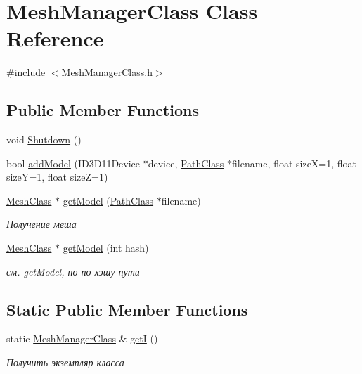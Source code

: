 \hypertarget{class_mesh_manager_class}{}\section{Mesh\+Manager\+Class Class Reference}
\label{class_mesh_manager_class}


{\ttfamily \#include $<$Mesh\+Manager\+Class.\+h$>$}

\subsection*{Public Member Functions}
\begin{DoxyCompactItemize}
\item 
void \hyperlink{class_mesh_manager_class_a65269ec3ad4c2295fd5a45c78aebdefb}{Shutdown} ()
\item 
bool \hyperlink{class_mesh_manager_class_a8f994d06e573766948bf7731ada8567a}{add\+Model} (I\+D3\+D11\+Device $\ast$device, \hyperlink{class_path_class}{Path\+Class} $\ast$filename, float sizeX=1, float sizeY=1, float sizeZ=1)
\item 
\hyperlink{class_mesh_class}{Mesh\+Class} $\ast$ \hyperlink{class_mesh_manager_class_a9f2a568cafeeafb602f02e00fda4ec23}{get\+Model} (\hyperlink{class_path_class}{Path\+Class} $\ast$filename)
\begin{DoxyCompactList}\small\item\em Получение меша \end{DoxyCompactList}\item 
\hyperlink{class_mesh_class}{Mesh\+Class} $\ast$ \hyperlink{class_mesh_manager_class_aa257d9db0f3f16419edac815624fa4c5}{get\+Model} (int hash)
\begin{DoxyCompactList}\small\item\em см. get\+Model, но по хэшу пути \end{DoxyCompactList}\end{DoxyCompactItemize}
\subsection*{Static Public Member Functions}
\begin{DoxyCompactItemize}
\item 
static \hyperlink{class_mesh_manager_class}{Mesh\+Manager\+Class} \& \hyperlink{class_mesh_manager_class_ae7de08958474910727bac3a0cabf70f5}{getI} ()
\begin{DoxyCompactList}\small\item\em Получить экземпляр класса \end{DoxyCompactList}\end{DoxyCompactItemize}
